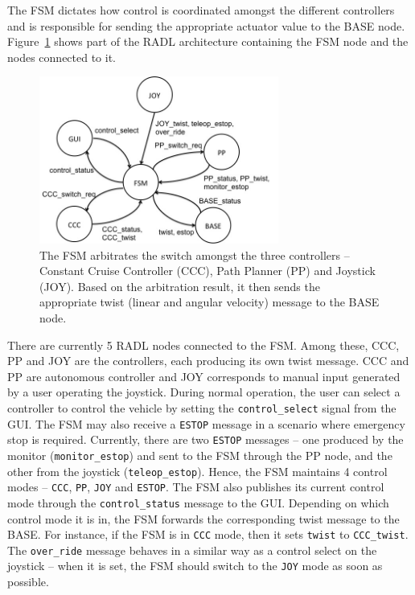 
The FSM dictates how control is coordinated amongst the different controllers and 
is responsible for sending the appropriate actuator value to the BASE node. 
Figure~\ref{fig:fsm_radl} shows part of the RADL architecture containing the FSM node 
and the nodes connected to it.

\begin{figure}[ht]
  \centering
  \includegraphics[width=0.7\textwidth]{figures/fsm_radl.jpg}
  \caption{The FSM arbitrates the switch amongst the three controllers -- Constant Cruise Controller (CCC), Path Planner (PP) and Joystick (JOY). Based on the arbitration result, it then sends the appropriate twist (linear and angular velocity) message to the BASE node.}
  \label{fig:fsm_radl}
\end{figure}

There are currently 5 RADL nodes connected to the FSM. 
Among these, CCC, PP and JOY are the controllers, each producing its own twist message. 
CCC and PP are autonomous controller and JOY corresponds to manual input generated by a user operating the joystick. 
During normal operation, the user can select a controller to control the vehicle by setting the \texttt{control\_select} signal from the GUI.
The FSM may also receive a \texttt{ESTOP} message in a scenario where emergency stop is required.  
Currently, there are two \texttt{ESTOP} messages -- one produced by the monitor (\texttt{monitor\_estop}) 
and sent to the FSM through the PP node, and the other from the joystick (\texttt{teleop\_estop}). 
Hence, the FSM maintains 4 control modes -- \texttt{CCC}, \texttt{PP}, \texttt{JOY} and \texttt{ESTOP}. 
The FSM also publishes its current control mode through the \texttt{control\_status} message to the GUI. 
Depending on which control mode it is in, the FSM forwards the corresponding twist message to the BASE. 
For instance, if the FSM is in \texttt{CCC} mode, then it sets \texttt{twist} to \texttt{CCC\_twist}. 
The \texttt{over\_ride} message behaves in a similar way as a control select on the joystick -- when it is set, 
the FSM should switch to the \texttt{JOY} mode as soon as possible. 

